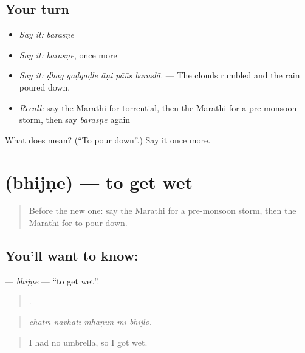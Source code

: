 \subsection*{Your turn}
\begin{itemize}
\raggedright
  \item \emph{Say it:} \emph{barasṇe}
  \item \emph{Say it:} \emph{barasṇe}, once more
  \item \emph{Say it:} \emph{ḍhag gaḍgaḍle āṇi pāūs baraslā.} — The clouds rumbled and the rain poured down.
  \item \emph{Recall:} say the Marathi for torrential, then the Marathi for a pre-monsoon storm, then say \emph{barasṇe} again
\end{itemize}

\begin{tcolorbox}[breakable,colback=teal!4,colframe=teal!35!black,title={Before you move on}]
What does  mean? (\textquotedblleft{}To pour down\textquotedblright{}.) Say it once more.
\end{tcolorbox}
\section[\texorpdfstring{\mr{भिजणे} (bhijṇe)}{भिजणे (bhijṇe)}]{ (bhijṇe) — to get wet}

\label{lesson:MR-C438-bhijne}



\begin{quote}
Before the new one: say the Marathi for a pre-monsoon storm, then the Marathi for to pour down.
\end{quote}

\subsection*{You'll want to know: }
\textbf{} — \emph{bhijṇe} — \textquotedblleft{}to get wet\textquotedblright{}.

\begin{quote}
    .
\end{quote}

\begin{quote}
\emph{chatrī navhatī mhaṇūn mī bhijlo.}
\end{quote}

\begin{quote}
I had no umbrella, so I got wet.
\end{quote}

